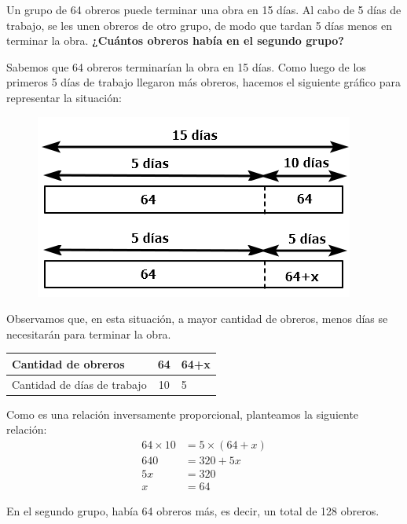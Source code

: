 Un grupo de 64 obreros puede terminar una obra en 15 días. Al cabo de 5 días de trabajo, se les unen obreros de otro grupo, de modo que tardan 5 días menos en terminar la obra.
\textbf{¿Cuántos obreros había en el segundo grupo?}

\begin{solutionbox}{9cm}
    Sabemos que 64 obreros terminarían la obra en 15 días. Como luego de los primeros 5 días de trabajo llegaron más obreros, hacemos el siguiente gráfico para representar la situación:

    \begin{minipage}{.35\textwidth}
        \begin{figure}[H]
            \centering
            \includegraphics[width=\linewidth]{../images/tableS8L103}
        \end{figure}
    \end{minipage}\hfill
    \begin{minipage}{.55\textwidth}
        Observamos que, en esta situación, a mayor cantidad de obreros, menos días se necesitarán para terminar la obra.
        \begin{table}[H]
            \centering
            \begin{tabular}{|l|c|l|}
                \hline
                Cantidad de obreros         & 64 & 64+x \\
                \hline
                Cantidad de días de trabajo & 10 & 5    \\
                \hline
            \end{tabular}
        \end{table}
        Como es una relación inversamente proporcional, planteamos la siguiente relación:
        \begin{align*}
            64 \times 10 & = 5 \times (64+x) \\
            640          & = 320 +5x         \\
            5x           & = 320             \\
            x            & = 64
        \end{align*}
    \end{minipage}

    En el segundo grupo, había 64 obreros más, es decir, un total de 128 obreros.
\end{solutionbox}